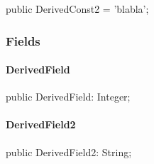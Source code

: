 \documentclass{report}
\begin{document}
\begin{list}{}{
\setlength{\itemindent}{0cm}
\setlength{\listparindent}{0cm}
\setlength{\leftmargin}{\evensidemargin}
\addtolength{\leftmargin}{\tmplength}
\settowidth{\labelsep}{X}
\addtolength{\leftmargin}{\labelsep}
\setlength{\labelwidth}{\tmplength}
}
\begin{flushleft}
\item[\textbf{Declaration}\hfill]
\begin{ttfamily}
public DerivedConst2 = 'blabla';\end{ttfamily}


\end{flushleft}
\end{list}
\subsubsection*{\large{\textbf{Fields}}\normalsize\hspace{1ex}\hfill}
\paragraph*{DerivedField}\hspace*{\fill}

\begin{list}{}{
\setlength{\itemindent}{0cm}
\setlength{\listparindent}{0cm}
\setlength{\leftmargin}{\evensidemargin}
\addtolength{\leftmargin}{\tmplength}
\settowidth{\labelsep}{X}
\addtolength{\leftmargin}{\labelsep}
\setlength{\labelwidth}{\tmplength}
}
\begin{flushleft}
\item[\textbf{Declaration}\hfill]
\begin{ttfamily}
public DerivedField: Integer;\end{ttfamily}


\end{flushleft}
\end{list}
\paragraph*{DerivedField2}\hspace*{\fill}

\begin{list}{}{
\setlength{\itemindent}{0cm}
\setlength{\listparindent}{0cm}
\setlength{\leftmargin}{\evensidemargin}
\addtolength{\leftmargin}{\tmplength}
\settowidth{\labelsep}{X}
\addtolength{\leftmargin}{\labelsep}
\setlength{\labelwidth}{\tmplength}
}
\begin{flushleft}
\item[\textbf{Declaration}\hfill]
\begin{ttfamily}
public DerivedField2: String;\end{ttfamily}


\end{flushleft}
\end{list}
\end{document}
